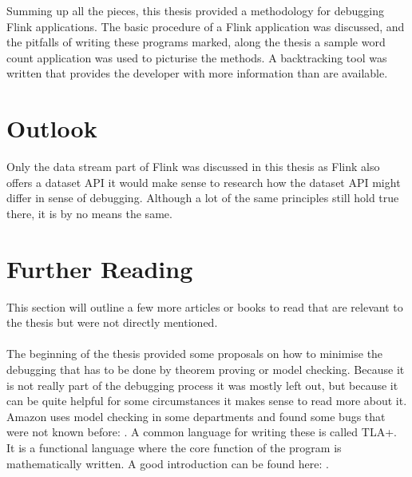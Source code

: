Summing up all the pieces, this thesis provided a methodology for debugging Flink applications. The basic procedure of a Flink application was discussed, and the pitfalls of writing these programs marked, along the thesis a sample word count application was used to picturise the methods. A backtracking tool was written that provides the developer with more information than are available.

\section{Outlook}
Only the data stream part of Flink was discussed in this thesis as Flink also offers a dataset API it would make sense to research how the dataset API might differ in sense of debugging. Although a lot of the same principles still hold true there, it is by no means the same.

\section{Further Reading}
This section will outline a few more articles or books to read that are relevant to the thesis but were not directly mentioned.

\paragraph{} The beginning of the thesis provided some proposals on how to minimise the debugging that has to be done by theorem proving or model checking. Because it is not really part of the debugging process it was mostly left out, but because it can be quite helpful for some circumstances it makes sense to read more about it. Amazon uses model checking in some departments and found some bugs that were not known before: \cite{Newcombe:2015:AWS:2749359.2699417}.
A common language for writing these is called TLA+. It is a functional language where the core function of the program is mathematically written. A good introduction can be found here: \cite{Lamport:2002:SST:579617}. \cite{ApacheFlink}
